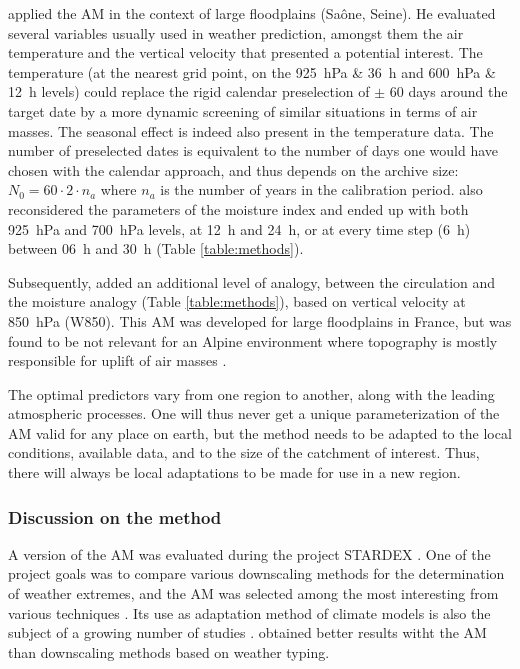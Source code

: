 \documentclass[review]{elsarticle}
\begin{document}
\citet{BenDaoud2010} applied the AM in the context of large floodplains (Sa\^{o}ne, Seine). He evaluated several variables usually used in weather prediction, amongst them the air temperature and the vertical velocity that presented a potential interest. The temperature (at the nearest grid point, on the 925~hPa \& 36~h and 600~hPa \& 12~h levels) could replace the rigid calendar preselection of $\pm$ 60 days around the target date by a more dynamic screening of similar situations in terms of air masses. The seasonal effect is indeed also present in the temperature data. The number of preselected dates is equivalent to the number of days one would have chosen with the calendar approach, and thus depends on the archive size: $N_{0} = 60 \cdot 2 \cdot n_{a}$ where $n_{a}$ is the number of years in the calibration period. \citet{BenDaoud2010} also reconsidered the parameters of the moisture index and ended up with both 925~hPa and 700~hPa levels, at 12~h and 24~h, or at every time step (6~h) between 06~h and 30~h (Table \ref{table:methods}).

Subsequently, \citet{BenDaoud2010} added an additional level of analogy, between the circulation and the moisture analogy (Table \ref{table:methods}), based on vertical velocity at 850~hPa (W850). This AM was developed for large floodplains in France, but was found to be not relevant for an Alpine environment where topography is mostly responsible for uplift of air masses \citep{Horton2012}. 

The optimal predictors vary from one region to another, along with the leading atmospheric processes. One will thus never get a unique parameterization of the AM valid for any place on earth, but the method needs to be adapted to the local conditions, available data, and to the size of the catchment of interest. Thus, there will always be local adaptations to be made for use in a new region.


\subsubsection{Discussion on the method}

A version of the AM was evaluated during the project STARDEX \citep[\textit{STAtistical and Regional dynamical Downscaling of EXtremes for European regions}, see][]{Goodess2003, Stardex2005}. One of the project goals was to compare various downscaling methods for the determination of weather extremes, and the AM was selected among the most interesting from various techniques \citep{Maheras2005, Schmidli2007}. Its use as adaptation method of climate models is also the subject of a growing number of studies \citep{Zorita1999, Wetterhall2005, Wetterhall2007, Matulla2007, Chardon2014, Dayon2015}. \citet{Bliefernicht2010} obtained better results witht the AM than downscaling methods based on weather typing.
\end{document}
